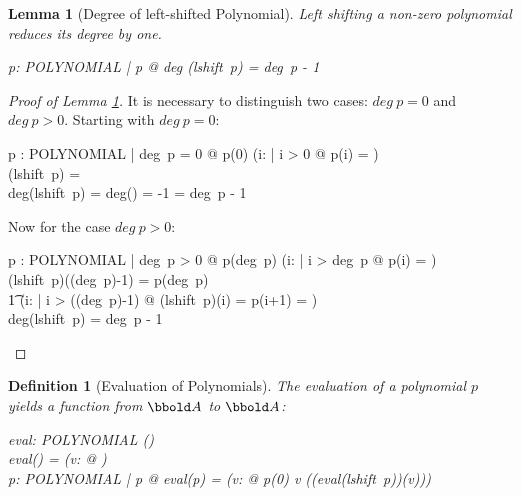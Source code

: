\documentclass[12pt]{scrartcl}
\newtheorem{lemma}{Lemma}[section]
\newtheorem{zdef}{Definition}[section]
\begin{document}
\begin{lemma}[Degree of left-shifted Polynomial]
  \label{lemma:degree-left-shift}
  Left shifting a non-zero polynomial reduces its degree by one.
  \begin{zed}
    \forall p: POLYNOMIAL | p \neq \zeropol @ deg (lshift~p) = deg~p - 1
  \end{zed}
\end{lemma}

\begin{proof}[Proof of Lemma \ref{lemma:degree-left-shift}]
  It is necessary to distinguish two cases: $deg~p = 0$ and $deg~p >
  0$. Starting with  $deg~p = 0$:
  \begin{argue}
    p : POLYNOMIAL | deg~p = 0 @ p(0) \neq \azero \land
    (\forall i: \nat | i > 0 @ p(i) = \azero)\\
    \vdash (lshift~p) = \zeropol \\
    \vdash deg(lshift~p) = deg(\zeropol) = -1 = deg~p - 1
  \end{argue}
  Now for the case $deg~p > 0$:
  \begin{argue}
    p : POLYNOMIAL | deg~p > 0 @ p(deg~p) \neq \azero \land
    (\forall i: \nat | i > deg~p @ p(i) = \azero)\\
    \vdash (lshift~p)((deg~p)-1) = p(deg~p) \neq \azero \\
    \t1 \land (\forall i: \nat | i > ((deg~p)-1) @ (lshift~p)(i) =
    p(i+1) = \azero)\\
    \vdash deg(lshift~p) = deg~p - 1
  \end{argue}
\end{proof}

\begin{zdef}[Evaluation of Polynomials]
  \label{zdef:evaluation}
  The evaluation of a polynomial $p$ yields a function from $\arithmos$ to
  $\arithmos$:
  \begin{axdef}
    eval: POLYNOMIAL \fun (\arithmos \fun \arithmos)\\
    \where
    eval(\zeropol) = (\lambda v: \arithmos @ \azero)\\
    \forall p: POLYNOMIAL | p \neq \zeropol @ eval(p) = (\lambda v:
    \arithmos @ p(0) \aplus v \amult ((eval(lshift~p))(v)))
  \end{axdef}
\end{zdef}
\end{document}
